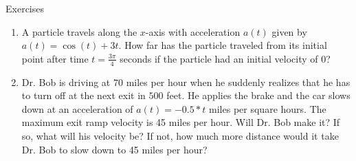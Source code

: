 \documentclass[../revisedmain.tex]{subfiles}
\begin{document}
\begin{center}
	\LARGE Exercises
\end{center}
\begin{enumerate}
	\item A particle travels along the $x$-axis with acceleration $a(t)$ given by $a(t)=\cos(t)+3t$. How far has the particle traveled from its initial point after time $t=\frac{3\pi}{4}$ seconds if the particle had an initial velocity of 0?
	\item Dr. Bob is driving at $70$ miles per hour when he suddenly realizes that he has to turn off at the next exit in $500$ feet. He applies the brake and the car slows down at an acceleration of $a(t)=-0.5*t$ miles per square hours. The maximum exit ramp velocity is 45 miles per hour. Will Dr. Bob make it? If so, what will his velocity be? If not, how much more distance would it take Dr. Bob to slow down to 45 miles per hour?
\end{enumerate}
\end{document}
